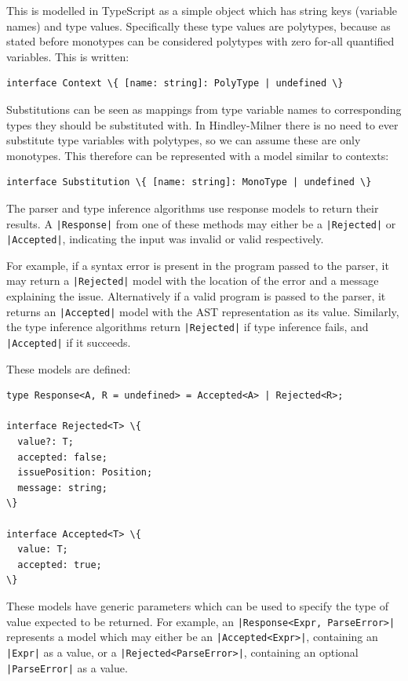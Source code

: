 \documentclass[a4paper,fleqn,12pt]{article}
\begin{document}
This is modelled in TypeScript as a simple object which has string keys (variable names) and type values. Specifically these type values are polytypes, because as stated before monotypes can be considered polytypes with zero for-all quantified variables. This is written:

\begin{verbatim}
interface Context \{ [name: string]: PolyType | undefined \}
\end{verbatim}

Substitutions can be seen as mappings from type variable names to corresponding types they should be substituted with. In Hindley-Milner there is no need to ever substitute type variables with polytypes, so we can assume these are only monotypes. This therefore can be represented with a model similar to contexts:

\begin{verbatim}
interface Substitution \{ [name: string]: MonoType | undefined \}
\end{verbatim}
\label{id:h.5yk2zijb0axq}
The parser and type inference algorithms use response models to return their results. A \texttt{|Response|} from one of these methods may either be a \texttt{|Rejected|} or \texttt{|Accepted|}, indicating the input was invalid or valid respectively.

For example, if a syntax error is present in the program passed to the parser, it may return a \texttt{|Rejected|} model with the location of the error and a message explaining the issue. Alternatively if a valid program is passed to the parser, it returns an \texttt{|Accepted|} model with the AST representation as its value. Similarly, the type inference algorithms return \texttt{|Rejected|} if type inference fails, and \texttt{|Accepted|} if it succeeds.

These models are defined:

\begin{verbatim}
type Response<A, R = undefined> = Accepted<A> | Rejected<R>;

interface Rejected<T> \{
  value?: T;
  accepted: false;
  issuePosition: Position;
  message: string;
\}

interface Accepted<T> \{
  value: T;
  accepted: true;
\}
\end{verbatim}

These models have generic parameters which can be used to specify the type of value expected to be returned. For example, an \texttt{|Response<Expr, ParseError>|} represents a model which may either be an \texttt{|Accepted<Expr>|}, containing an \texttt{|Expr|} as a value, or a \texttt{|Rejected<ParseError>|}, containing an optional \texttt{|ParseError|} as a value.
\end{document}
